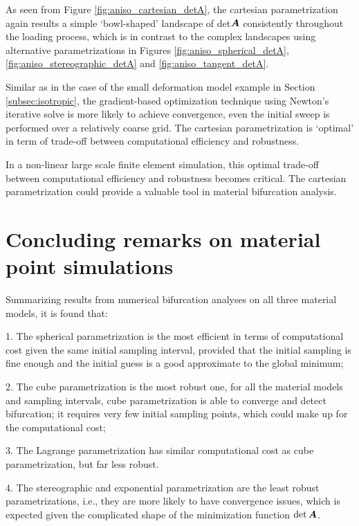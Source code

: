 \documentclass[12pt]{article}
\numberwithin{equation}{section}
\begin{document}
As seen from Figure \ref{fig:aniso_cartesian_detA}, the cartesian 
parametrization again results a simple `bowl-shaped' landscape of det$
{\boldsymbol{A}}$ consistently throughout the loading process, which is in contrast 
to the complex landscapes using alternative parametrizations in 
Figures \ref{fig:aniso_spherical_detA},
\ref{fig:aniso_stereographic_detA} and \ref{fig:aniso_tangent_detA}. 

Similar as in the case of the small deformation model example in 
Section \ref{subsec:isotropic}, the gradient-based optimization 
technique using Newton's iterative solve is more likely to achieve 
convergence, even the initial sweep is performed over a relatively 
coarse grid. The cartesian parametrization is `optimal' in term of trade-off between computational efficiency and robustness. 

In a non-linear large scale finite element simulation, this optimal 
trade-off between computational efficiency and robustness becomes 
critical. The cartesian parametrization could provide a valuable tool 
in material bifurcation analysis. 

\section{Concluding remarks on material point simulations}
Summarizing results from numerical bifurcation analyses on all three
material models, it is found that:

1. The spherical parametrization is the most efficient in terms of
computational cost given the same initial sampling interval, provided
that the initial sampling is fine enough and the initial guess is a
good approximate to the global minimum;

2. The cube parametrization is the most robust one, for all the
material models and sampling intervals, cube parametrization is able
to converge and detect bifurcation; it requires very few initial
sampling points, which could make up for the computational cost;

3. The Lagrange parametrization has similar computational cost as cube
parametrization, but far less robust.

4. The stereographic and exponential parametrization are the least
robust parametrizations, i.e., they are more likely to have
convergence issues, which is expected given the complicated shape of
the minimization function $\det{\boldsymbol{A}}$.



\end{document}
